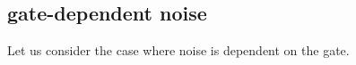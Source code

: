 \documentclass[aps,pra,reprint,superscriptaddress]{revtex4-2}
\newcommand{\betat}{\widetilde{\beta}}
\newcommand{\Omegat}{\widetilde{\Omega}}
\begin{document}

\subsection{gate-dependent noise}
Let us consider the case where noise is dependent on the gate. 
\end{document}
